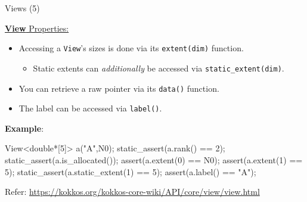 
\begin{frame}[fragile]{Views (5)}

  \ul{\textbf{View} Properties:}

  \begin{itemize}
    \item Accessing a \texttt{View}'s sizes is done via its \texttt{extent(dim)} function.
         \begin{itemize}
		 \item Static extents can \emph{additionally} be accessed via \texttt{static\_extent(dim)}.
	 \end{itemize}
    \item You can retrieve a raw pointer via its \texttt{data()} function.
    \item The label can be accessed via \texttt{label()}.
  \end{itemize}

  \textbf{Example}:

  \begin{code}[keywords={View,extent,static_extent,data,label,rank,is_allocated}]
	  View<double*[5]> a("A",N0);
	  static_assert(a.rank() == 2);
	  static_assert(a.is_allocated());
	  assert(a.extent(0) == N0);
	  assert(a.extent(1) == 5);
	  static_assert(a.static_extent(1) == 5);
	  assert(a.label() == "A");
  \end{code}

  {\small Refer: \href{https://kokkos.org/kokkos-core-wiki/API/core/view/view.html}{https://kokkos.org/kokkos-core-wiki/API/core/view/view.html}}

\end{frame}

